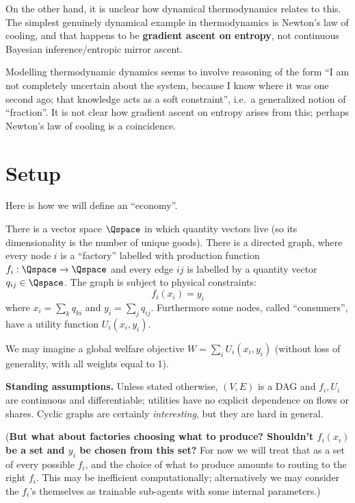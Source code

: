 On the other hand, it is unclear how dynamical thermodynamics relates to this. The simplest
genuinely dynamical example in thermodynamics is Newton's law of cooling, and that happens to
be \textbf{gradient ascent on
entropy}, not continuous Bayesian inference/entropic mirror ascent.

Modelling thermodynamic dynamics seems to involve reasoning of the form ``I am not completely
uncertain about the system, because I know where it was one second ago; that knowledge acts
as a soft constraint'', i.e.\ a generalized notion of ``fraction''. It is not clear how
gradient ascent on entropy arises from this; perhaps Newton's law of cooling is a
coincidence.

\section{Setup}\label{agency:sec:setup}

Here is how we will define an ``economy''.

\begin{definition}[economy]\label{agency:def:economy}
There is a vector space $\Qspace$ in which quantity vectors live (so its dimensionality is
the number of unique goods). There is a directed graph, where every node $i$ is a
``factory'' labelled with production function $f_i:\Qspace\to\Qspace$ and every edge $ij$ is
labelled by a quantity vector $q_{ij}\in\Qspace$. The graph is subject to physical
constraints:
\[f_i(x_i)=y_i\]
where $x_i=\sum_k q_{ki}$ and $y_i=\sum_j q_{ij}$. Furthermore some nodes, called
``consumers'', have a utility function $U_i(x_i,y_i)$.
\end{definition}

We may imagine a global welfare objective $W = \sum_i U_i(x_i, y_i)$ (without loss of generality,
with all weights equal to 1).

\textbf{Standing assumptions.} Unless stated otherwise, $(V,E)$ is a DAG and $f_i, U_i$ are
continuous and differentiable; utilities have no explicit dependence on flows or shares. Cyclic graphs
are certainly \emph{interesting}, but they are hard in general.

(\textbf{But what about factories choosing what to produce? Shouldn't $f_{i}(x_i)$ be a set
and $y_i$ be chosen from this set?} For now we will treat that as a set of every possible
$f_i$, and the choice of what to produce amounts to routing to the right $f_i$. This may be
inefficient computationally; alternatively we may consider the $f_i$'s
themselves as trainable sub-agents with some internal parameters.)

